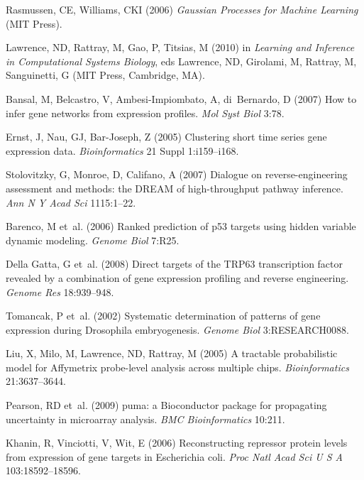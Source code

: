 \documentclass{pnastwo}
\begin{document}
\begin{article}
\begin{thebibliography}{10}
Rasmussen, CE, Williams, CKI
\newblock (2006) \emph{Gaussian Processes for Machine Learning}
\newblock (MIT Press).

Lawrence, ND, Rattray, M, Gao, P, Titsias, M
\newblock (2010) in \emph{Learning and Inference in Computational Systems
  Biology}, eds{} Lawrence, ND, Girolami, M, Rattray, M, Sanguinetti, G
\newblock (MIT Press, Cambridge, MA).

Bansal, M, Belcastro, V, Ambesi-Impiombato, A, di~Bernardo, D
\newblock (2007) How to infer gene networks from expression profiles.
\newblock \emph{Mol Syst Biol} 3:78.

Ernst, J, Nau, GJ, Bar-Joseph, Z
\newblock (2005) Clustering short time series gene expression data.
\newblock \emph{Bioinformatics} 21 Suppl 1:i159--i168.

Stolovitzky, G, Monroe, D, Califano, A
\newblock (2007) Dialogue on reverse-engineering assessment and methods: the
  {DREAM} of high-throughput pathway inference.
\newblock \emph{Ann N Y Acad Sci} 1115:1--22.

Barenco, M et~al.
\newblock (2006) Ranked prediction of p53 targets using hidden variable dynamic
  modeling.
\newblock \emph{Genome Biol} 7:R25.

{Della Gatta}, G et~al.
\newblock (2008) Direct targets of the {TRP63} transcription factor revealed by
  a combination of gene expression profiling and reverse engineering.
\newblock \emph{Genome Res} 18:939--948.

Tomancak, P et~al.
\newblock (2002) Systematic determination of patterns of gene expression during
  {D}rosophila embryogenesis.
\newblock \emph{Genome Biol} 3:RESEARCH0088.

Liu, X, Milo, M, Lawrence, ND, Rattray, M
\newblock (2005) A tractable probabilistic model for {A}ffymetrix probe-level
  analysis across multiple chips.
\newblock \emph{Bioinformatics} 21:3637--3644.

Pearson, RD et~al.
\newblock (2009) puma: a {B}ioconductor package for propagating uncertainty in
  microarray analysis.
\newblock \emph{BMC Bioinformatics} 10:211.

Khanin, R, Vinciotti, V, Wit, E
\newblock (2006) Reconstructing repressor protein levels from expression of
  gene targets in {E}scherichia coli.
\newblock \emph{Proc Natl Acad Sci U S A} 103:18592--18596.


\end{thebibliography}
\end{article}
\end{document}
